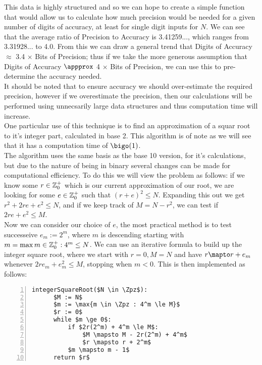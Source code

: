 This data is highly structured and so we can hope to create a simple function that would allow us to calculate how much precision would be needed for a given number of digits of accuracy, at least for single digit inputs for \(N\). We can see that the average ratio of Precision to Accuracy is 3.41259..., which ranges from 3.31928... to 4.0. From this we can draw a general trend that Digits of Accuracy \(\approx\) 3.4 \(\times\) Bits of Precision; thus if we take the more generous assumption that Digits of Accuracy \(\appprox\) 4 \(\times\) Bits of Precision, we can use this to pre-determine the accuracy needed.\\

It should be noted that to ensure accuracy we should over-estimate the required precision, however if we overestimate the precision, then our calculations will be performed using unnecsarily large data structures and thus computation time will increase.\\

One particular use of this technique is to find an approximation of a squar root to it's integer part, calculated in base 2. This algorithm is of note as we will see that it has a computation time of \(\bigo(1)\).\\

The algorithm uses the same basis as the base 10 version, for it's calculations, but due to the nature of being in binary several changes can be made for computational efficiency. To do this we will view the problem as follows: if we know some \(r \in \mathbb{Z}^+_0\) which is our current approximation of our root, we are looking for some \(e \in \mathbb{Z}^+_0\) such that \((r+e)^2 \le N\). Expanding this out we get \(r^2 + 2re + e^2 \le N\), and if we keep track of \(M = N - r^2\), we can test if \(2re + e^2 \le M\).\\

Now we can consider our choice of \(e\), the most practical method is to test successeive \(e_m := 2^m\), where \(m\) is descending starting with \(m = \max{m \in \mathbb{Z}^+_0: 4^m \le N}\). We can use an iterative formula to build up the integer square root, where we start with \(r = 0, M = N\) and have \(r \mapto r + e_m\) whenever \(2re_m + e_m^2 \le M\), stopping when \(m < 0\). This is then implemented as follows:\\

\begin{lstlisting}[numbers=left,frame=single,mathescape,caption={Integer Square Root Algorithm}]
  integerSquareRoot($N \in \Zpz$):
      $M := N$
      $m := \max{m \in \Zpz : 4^m \le M}$
      $r := 0$
      while $m \ge 0$:
          if $2r(2^m) + 4^m \le M$:
              $M \mapsto M - 2r(2^m) + 4^m$
              $r \mapsto r + 2^m$
          $m \mapsto m - 1$
      return $r$
\end{lstlisting}

